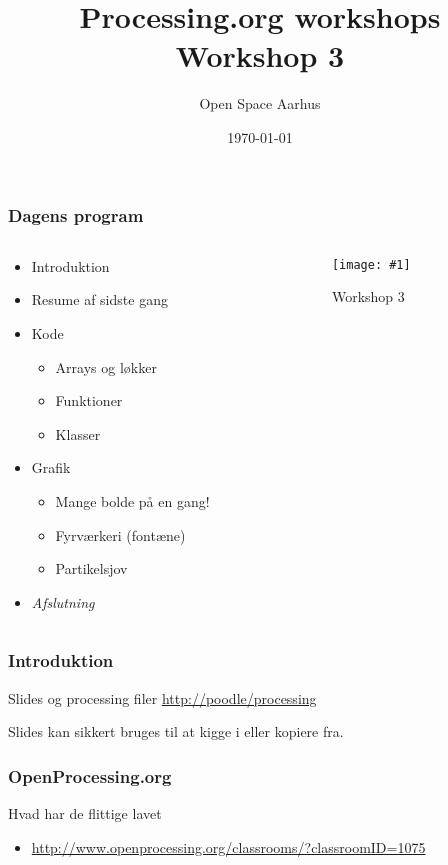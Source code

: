 \documentclass{beamer}
\title{Processing.org workshops\\Workshop 3}
\author{Open Space Aarhus}
\date{\today}
\institute[Bryggervej 30]{Bryggervej 30, 8240 Århus N}
\newcommand{\FIG}[2]{
  \begin{figure}[]
    \centering
    \texttt{[image: \#1]}
    \caption{#2}
    \label{fig:#1}
  \end{figure}
}
\begin{document}
\begin{frame}[label=titlepage]
  \titlepage
\end{frame}

\begin{frame}
  \frametitle{Dagens program}
  \begin{columns}
    \begin{column}{0.5\textwidth}
  
  \begin{itemize}
  \item Introduktion
  \item Resume af sidste gang
  \item Kode
    \begin{itemize}
    \item Arrays og løkker
    \item Funktioner
    \item Klasser
    \end{itemize}

  \item Grafik
    \begin{itemize}
    \item Mange bolde på en gang!
    \item Fyrværkeri (fontæne)
    \item Partikelsjov
    \end{itemize}

  \item \emph{Afslutning}
  \end{itemize}						

    \end{column}
    
    \begin{column}{0.5\textwidth}
      \FIG{dagensprogram}{Workshop 3}
    \end{column}
  \end{columns}
    
\end{frame}


\begin{frame}
  \frametitle{Introduktion}
  
  \begin{block}{Slides og processing filer}
    \url{http://poodle/processing}   
  \end{block}
  {\tiny Slides kan sikkert bruges til at kigge i eller kopiere fra.}
\end{frame}


\begin{frame}
  \frametitle{OpenProcessing.org}
  \begin{block}{Hvad har de flittige lavet}
    \begin{itemize}
    \item \url{http://www.openprocessing.org/classrooms/?classroomID=1075}
    \end{itemize}
  \end{block}
\end{frame}
\end{document}
